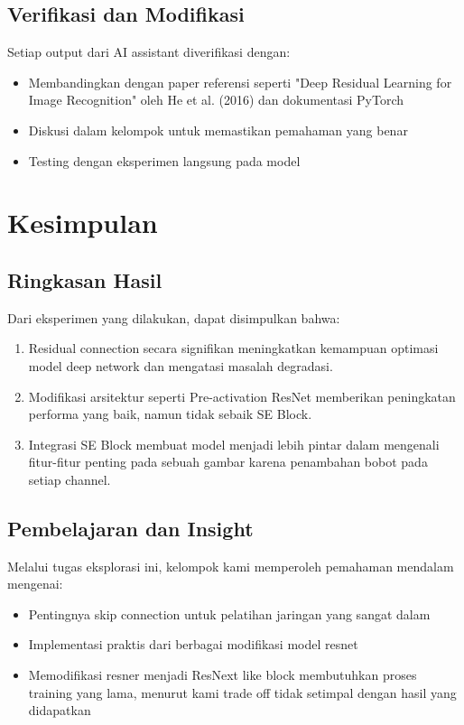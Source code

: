 \documentclass[11pt,a4paper]{article}
\begin{document}
\subsection{Verifikasi dan Modifikasi}

Setiap output dari AI assistant diverifikasi dengan:

\begin{itemize}
    \item Membandingkan dengan paper referensi seperti "Deep Residual Learning for Image Recognition" oleh He et al. (2016) dan dokumentasi PyTorch \cite{pytorch-docs}
    \item Diskusi dalam kelompok untuk memastikan pemahaman yang benar
    \item Testing dengan eksperimen langsung pada model
\end{itemize}

\section{Kesimpulan}

\subsection{Ringkasan Hasil}

Dari eksperimen yang dilakukan, dapat disimpulkan bahwa:

\begin{enumerate}
    \item Residual connection secara signifikan meningkatkan kemampuan optimasi model deep network dan mengatasi masalah degradasi.
    \item Modifikasi arsitektur seperti Pre-activation ResNet memberikan peningkatan performa yang baik, namun tidak sebaik SE Block.
    \item Integrasi SE Block membuat model menjadi lebih pintar dalam mengenali fitur-fitur penting pada sebuah gambar karena penambahan bobot pada setiap channel.
\end{enumerate}

\subsection{Pembelajaran dan Insight}

Melalui tugas eksplorasi ini, kelompok kami memperoleh pemahaman mendalam mengenai:

\begin{itemize}
    \item Pentingnya skip connection untuk pelatihan jaringan yang sangat dalam
    \item Implementasi praktis dari berbagai modifikasi model resnet
    \item Memodifikasi resner menjadi ResNext like block membutuhkan proses training yang lama, menurut kami trade off tidak setimpal dengan hasil yang didapatkan
\end{itemize}
\end{document}
